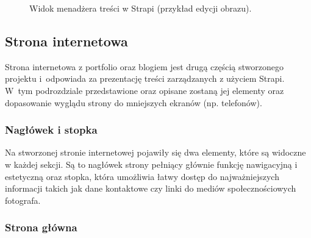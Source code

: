 \documentclass[a4paper, 12pt, twoside]{article}
\numberwithin{figure}{section}
\begin{document}
\begin{sloppypar}
\begin{figure}[H] 
    \centering
   \caption{Widok menadżera treści w Strapi (przykład edycji obrazu).}
   \label{fig:strapi-use-5.jpg}
\end{figure}


\subsection{Strona internetowa} \label{next-use}

Strona internetowa z portfolio oraz blogiem jest drugą częścią stworzonego projektu i~odpowiada za prezentację treści zarządzanych z użyciem Strapi. W~tym podrozdziale przedstawione oraz opisane zostaną jej elementy oraz dopasowanie wyglądu strony do mniejszych ekranów (np. telefonów). 

\subsubsection*{Nagłówek i stopka}

Na stworzonej stronie internetowej pojawiły się dwa elementy, które są widoczne w każdej sekcji. Są to nagłówek strony pełniący głównie funkcję nawigacyjną i estetyczną oraz stopka, która umożliwia łatwy dostęp do najważniejszych informacji 
takich jak dane kontaktowe czy linki do mediów społecznościowych fotografa. 

\subsubsection*{Strona główna}


\end{sloppypar}
\end{document}
